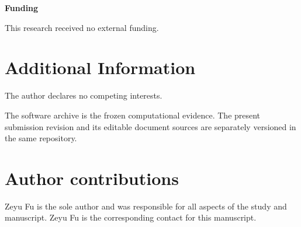 \documentclass[11pt]{article}
\begin{document}
\noindent\textbf{Funding}\par\nobreak

This research received no external funding.



\section*{Additional Information}
The author declares no competing interests.

{\footnotesize\raggedright\setlength{\bibsep}{1pt}\setlength{\emergencystretch}{3em}
The software archive is the frozen computational evidence. The present submission revision and its editable document sources are separately versioned in the same repository.


}

\section*{Author contributions}
Zeyu Fu is the sole author and was responsible for all aspects of the study and manuscript. Zeyu Fu is the corresponding contact for this manuscript.
\end{document}
